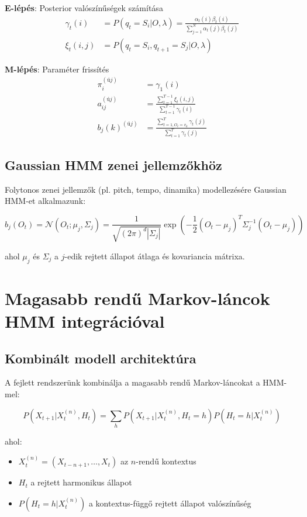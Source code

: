 \textbf{E-lépés}: Posterior valószínűségek számítása
\begin{align}
\gamma_t(i) &= P(q_t = S_i | O, \lambda) = \frac{\alpha_t(i)\beta_t(i)}{\sum_{j=1}^{N} \alpha_t(j)\beta_t(j)} \\
\xi_t(i,j) &= P(q_t = S_i, q_{t+1} = S_j | O, \lambda)
\end{align}

\textbf{M-lépés}: Paraméter frissítés
\begin{align}
\pi_i^{(új)} &= \gamma_1(i) \\
a_{ij}^{(új)} &= \frac{\sum_{t=1}^{T-1} \xi_t(i,j)}{\sum_{t=1}^{T-1} \gamma_t(i)} \\
b_j(k)^{(új)} &= \frac{\sum_{t=1, O_t=v_k}^{T} \gamma_t(j)}{\sum_{t=1}^{T} \gamma_t(j)}
\end{align}

\subsection{Gaussian HMM zenei jellemzőkhöz}

Folytonos zenei jellemzők (pl. pitch, tempo, dinamika) modellezésére Gaussian HMM-et alkalmazunk:

\begin{equation}
b_j(O_t) = \mathcal{N}(O_t; \mu_j, \Sigma_j) = \frac{1}{\sqrt{(2\pi)^d |\Sigma_j|}} \exp\left(-\frac{1}{2}(O_t - \mu_j)^T \Sigma_j^{-1} (O_t - \mu_j)\right)
\end{equation}

ahol $\mu_j$ és $\Sigma_j$ a $j$-edik rejtett állapot átlaga és kovariancia mátrixa.

\section{Magasabb rendű Markov-láncok HMM integrációval}

\subsection{Kombinált modell architektúra}

A fejlett rendszerünk kombinálja a magasabb rendű Markov-láncokat a HMM-mel:

\begin{equation}
P(X_{t+1} | X_t^{(n)}, H_t) = \sum_{h} P(X_{t+1} | X_t^{(n)}, H_t = h) P(H_t = h | X_t^{(n)})
\end{equation}

ahol:
\begin{itemize}
    \item $X_t^{(n)} = (X_{t-n+1}, \ldots, X_t)$ az $n$-rendű kontextus
    \item $H_t$ a rejtett harmonikus állapot
    \item $P(H_t = h | X_t^{(n)})$ a kontextus-függő rejtett állapot valószínűség
\end{itemize}

